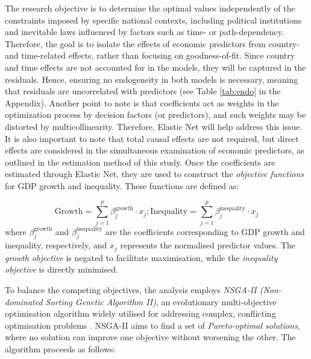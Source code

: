 \documentclass[12pt]{article}
\begin{document}
The research objective is to determine the optimal values independently of the constraints imposed by specific national contexts, including political institutions and inevitable laws influenced by factors such as time- or path-dependency. Therefore, the goal is to isolate the effects of economic predictors from country- and time-related effects, rather than focusing on goodness-of-fit. Since country and time effects are not accounted for in the models, they will be captured in the residuals. Hence, ensuring no endogeneity in both models is necessary, meaning that residuals are uncorrelated with predictors (see Table \ref{tab:endo} in the Appendix). Another point to note is that coefficients act as weights in the optimization process by decision factors (or predictors), and such weights may be distorted by multicollinearity. Therefore, Elastic Net will help address this issue. It is also important to note that total causal effects are not required, but direct effects are considered in the simultaneous examination of economic predictors, as outlined in the estimation method of this study. Once the coefficients are estimated through Elastic Net, they are used to construct the \textit{objective functions} for GDP growth and inequality. These functions are defined as:

\[
\text{Growth} = \sum_{j=1}^{p} \beta_{j}^{\text{growth}} \cdot x_j; \text{Inequality} = \sum_{j=1}^{p} \beta_{j}^{\text{inequality}} \cdot x_j
\]
where \(\beta_{j}^{\text{growth}}\) and \(\beta_{j}^{\text{inequality}}\) are the coefficients corresponding to GDP growth and inequality, respectively, and \(x_j\) represents the normalised predictor values. The \textit{growth objective} is negated to facilitate maximisation, while the \textit{inequality objective} is directly minimised.

To balance the competing objectives, the analysis employs \textit{NSGA-II (Non-dominated Sorting Genetic Algorithm II)}, an evolutionary multi-objective optimisation algorithm widely utilised for addressing complex, conflicting optimisation problems \parencite{deb2002fast}. NSGA-II aims to find a set of \textit{Pareto-optimal solutions}, where no solution can improve one objective without worsening the other. The algorithm proceeds as follows:
\end{document}
